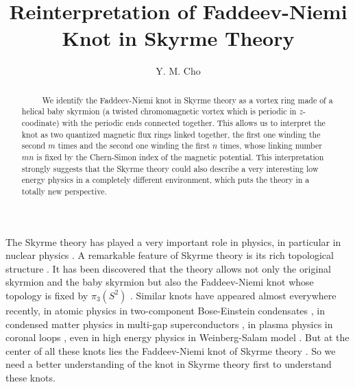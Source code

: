\documentclass[twocolumn,showpacs,showkeys]{revtex4}
\begin{document}
\title{Reinterpretation of Faddeev-Niemi Knot in Skyrme Theory}
\author{Y. M. Cho}

\begin{abstract}
~~~~~We identify the Faddeev-Niemi knot in Skyrme theory as a
vortex ring made of a helical baby skyrmion (a twisted
chromomagnetic vortex which is periodic in $z$-coodinate) with the
periodic ends connected together. This allows us to interpret the
knot as two quantized magnetic flux rings linked together, the
first one winding the second $m$ times and the second one winding
the first $n$ times, whose linking number $mn$ is fixed by
the Chern-Simon index of the magnetic potential.
This interpretation strongly suggests that the
Skyrme theory could also describe a very interesting low energy
physics in a completely different environment, which puts the
theory in a totally new perspective.
\end{abstract}
\maketitle

The Skyrme theory has played a very important role in physics,
in particular in nuclear physics \cite{skyr,prep,piet}.
A remarkable feature of Skyrme theory is
its rich topological structure \cite{cho01}. It has
been discovered that the theory allows not only the original
skyrmion and the baby skyrmion but also the Faddeev-Niemi knot
whose topology is fixed by $\pi_3(S^2)$ \cite{cho01,fadd1}.
Similar knots
have appeared almost everywhere recently, in atomic physics
in two-component Bose-Einstein condensates \cite{cho1,ruo,cho2},
in condensed matter physics in multi-gap superconductors \cite{cho2,baba},
in plasma physics in coronal loops \cite{fadd2},
even in high energy physics
in Weinberg-Salam model \cite{cho3}.
But at the center of all these knots
lies the Faddeev-Niemi knot of Skyrme theory \cite{cho1,cho2,cho3}.
So we need a better understanding of the knot in Skyrme theory first
to understand these knots.
\end{document}
